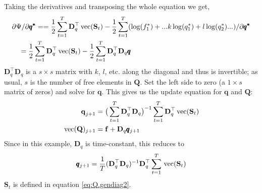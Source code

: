 \documentclass[]{article}
\def\DD{\mbox{$\mathbf D$}}	\def\dd{\mbox{$\mathbf d$}}
\def\QQ{\mbox{$\mathbf Q$}}	 \def\qq{\mbox{$\mathbf q$}} \def\Qb{\mbox{$\mathbf G$}}  \def\Qm{\mathbb{Q}}
\def\SS{\mbox{$\mathbf S$}}
\def\vec{\,\textup{\textrm{vec}}}
\begin{document}
Taking the derivatives and transposing the whole equation we get,
\begin{equation}\label{eq:Q.gendiag4}
\begin{split}
&\partial\Psi/\partial\pmb{q^{*}} = 
= \frac{1}{2} \sum_{t=1}^T\DD_q^\top \vec(\SS_t) - \frac{1}{2}\sum_{t=1}^T(\log(f^{*}_1) + ... k\log(q^{*}_1) + l\log(q^{*}_2)...)/\partial\pmb{q^{*}}\\
&\quad = \frac{1}{2} \sum_{t=1}^T\DD_q^\top \vec(\SS_t) - \frac{1}{2}\sum_{t=1}^T\DD_q^\top\DD_q\pmb{q}
\end{split}
\end{equation}
$\DD_q^\top\DD_q$ is a $s \times s$ matrix with $k$, $l$, etc. along the diagonal and thus is invertible; as usual, $s$ is the number of free elements in $\QQ$.  Set the left side to zero (a $1 \times s$ matrix of zeros) and solve for $\pmb{q}$.  This gives us the update equation for $\qq$ and $\QQ$:
\begin{equation}\label{eq:Q.diag.update}
\begin{split}
\qq_{j+1} &= \big(\sum_{t=1}^T\DD_q^\top\DD_q\big)^{-1}\sum_{t=1}^T\DD_q^\top\vec(\SS_t)\\
\vec(\QQ)_{j+1} &= \ff + \DD_q\pmb{q}_{j+1}
\end{split}
\end{equation}
Since in this example, $\DD_q$ is time-constant, this reduces to 
\begin{equation*}
\pmb{q}_{j+1} = \frac{1}{T}(\DD_q^\top\DD_q)^{-1}\DD_q^\top\sum_{t=1}^T\vec(\SS_t)
\end{equation*}
$\SS_t$ is defined in equation \ref{eq:Q.gendiag2}.
\end{document}
